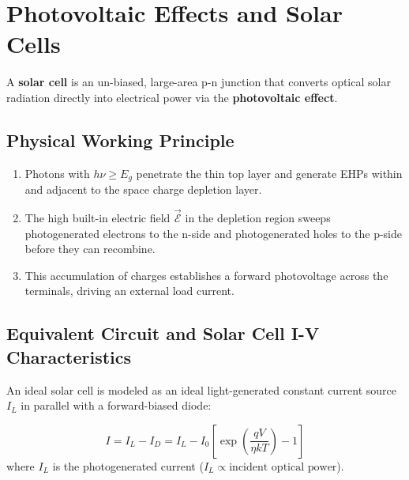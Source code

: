 \documentclass[12pt,a4paper]{article}
\begin{document}
\section{Photovoltaic Effects and Solar Cells}

A \textbf{solar cell} is an un-biased, large-area p-n junction that converts optical solar radiation directly into electrical power via the \textbf{photovoltaic effect}.

\subsection{Physical Working Principle}
\begin{enumerate}[label=\arabic*., leftmargin=*]
  \item Photons with $h\nu \ge E_g$ penetrate the thin top layer and generate EHPs within and adjacent to the space charge depletion layer.
  \item The high built-in electric field $\vec{\mathcal{E}}$ in the depletion region sweeps photogenerated electrons to the n-side and photogenerated holes to the p-side before they can recombine.
  \item This accumulation of charges establishes a forward photovoltage across the terminals, driving an external load current.
\end{enumerate}

\subsection{Equivalent Circuit and Solar Cell I-V Characteristics}
An ideal solar cell is modeled as an ideal light-generated constant current source $I_L$ in parallel with a forward-biased diode:

\begin{tcolorbox}[formulabox, title={\textbf{Solar Cell Current-Voltage Equation}}]
\begin{equation}
  I = I_L - I_D = I_L - I_0 \left[ \exp\left(\frac{q V}{\eta k T}\right) - 1 \right]
\end{equation}
where $I_L$ is the photogenerated current ($I_L \propto \text{incident optical power}$).
\end{tcolorbox}
\end{document}
